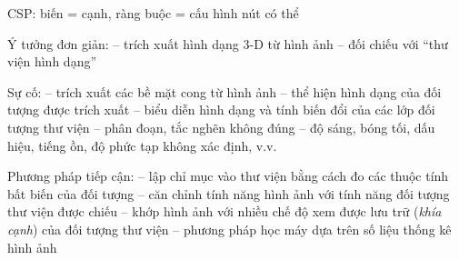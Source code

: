 \documentclass{article}
\begin{document}
\begin{huge}

\vspace*{0.2in}


CSP: biến = cạnh, ràng buộc = cấu hình nút có thể


Ý tưởng đơn giản:\al
-- trích xuất hình dạng 3-D từ hình ảnh\al
-- đối chiếu với ``thư viện hình dạng''

Sự cố:\al
-- trích xuất các bề mặt cong từ hình ảnh\al
-- thể hiện hình dạng của đối tượng được trích xuất\al
-- biểu diễn hình dạng và tính biến đổi của các lớp đối tượng thư viện\al
-- phân đoạn, tắc nghẽn không đúng\al
-- độ sáng, bóng tối, dấu hiệu, tiếng ồn, độ phức tạp không xác định, v.v.

Phương pháp tiếp cận:\al
-- lập chỉ mục vào thư viện bằng cách đo các thuộc tính bất biến của đối tượng\al
-- căn chỉnh tính năng hình ảnh với tính năng đối tượng thư viện được chiếu \al
-- khớp hình ảnh với nhiều chế độ xem được lưu trữ (\emph{khía cạnh}) của đối tượng thư viện\al
-- phương pháp học máy dựa trên số liệu thống kê hình ảnh



\end{huge}
\end{document}
